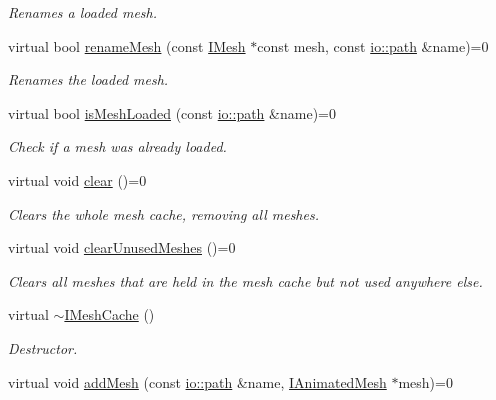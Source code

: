 \begin{DoxyCompactItemize}
\begin{DoxyCompactList}\small\item\em Renames a loaded mesh. \end{DoxyCompactList}\item 
virtual bool \hyperlink{classirr_1_1scene_1_1IMeshCache_a4533c81f4f3df112fa106d6fb1118f3b}{rename\+Mesh} (const \hyperlink{classirr_1_1scene_1_1IMesh}{I\+Mesh} $\ast$const mesh, const \hyperlink{namespaceirr_1_1io_a6468281622ce3a1c46b72e19f32dded5}{io\+::path} \&name)=0
\begin{DoxyCompactList}\small\item\em Renames the loaded mesh. \end{DoxyCompactList}\item 
virtual bool \hyperlink{classirr_1_1scene_1_1IMeshCache_a42a13fab5b76ab7142a1d47dac80548b}{is\+Mesh\+Loaded} (const \hyperlink{namespaceirr_1_1io_a6468281622ce3a1c46b72e19f32dded5}{io\+::path} \&name)=0
\begin{DoxyCompactList}\small\item\em Check if a mesh was already loaded. \end{DoxyCompactList}\item 
virtual void \hyperlink{classirr_1_1scene_1_1IMeshCache_ad92d924e558c3a7504f9154ee29b1569}{clear} ()=0
\begin{DoxyCompactList}\small\item\em Clears the whole mesh cache, removing all meshes. \end{DoxyCompactList}\item 
virtual void \hyperlink{classirr_1_1scene_1_1IMeshCache_a9f3e20b8e0f66d59bc454a311d13bbee}{clear\+Unused\+Meshes} ()=0
\begin{DoxyCompactList}\small\item\em Clears all meshes that are held in the mesh cache but not used anywhere else. \end{DoxyCompactList}\item 
\mbox{\label{classirr_1_1scene_1_1IMeshCache_a6d1bfbd0bda8a559d85cfd6735bc0667}} 
virtual \hyperlink{classirr_1_1scene_1_1IMeshCache_a6d1bfbd0bda8a559d85cfd6735bc0667}{$\sim$\+I\+Mesh\+Cache} ()
\begin{DoxyCompactList}\small\item\em Destructor. \end{DoxyCompactList}\item 
virtual void \hyperlink{classirr_1_1scene_1_1IMeshCache_a2959812a3a393817b1db42761766c49b}{add\+Mesh} (const \hyperlink{namespaceirr_1_1io_a6468281622ce3a1c46b72e19f32dded5}{io\+::path} \&name, \hyperlink{classirr_1_1scene_1_1IAnimatedMesh}{I\+Animated\+Mesh} $\ast$mesh)=0

\end{DoxyCompactItemize}
